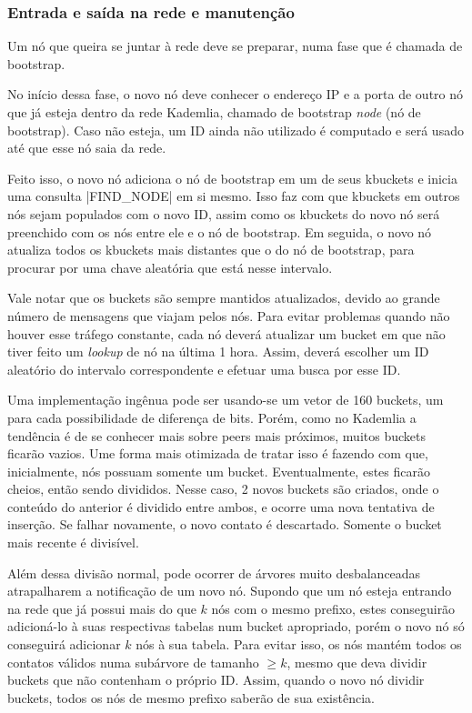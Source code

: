 
\subsubsection*{Entrada e saída na rede e manutenção}

Um nó que queira se juntar à rede deve se preparar, numa fase que é chamada de
\gls{bootstrap}.

No início dessa fase, o novo nó deve conhecer o endereço IP e a porta de outro nó que
já esteja dentro da rede Kademlia, chamado de \gls*{bootstrap} \emph{node} (nó de
\gls*{bootstrap}). Caso não esteja, um ID ainda não utilizado é computado e será usado
até que esse nó saia da rede.

Feito isso, o novo nó adiciona o nó de \gls*{bootstrap} em um de seus \glspl*{kbucket}
e inicia uma consulta \bverb|FIND_NODE| em si mesmo. Isso faz com que \glspl*{kbucket}
em outros nós sejam populados com o novo ID, assim como os \glspl*{kbucket} do novo nó
será preenchido com os nós entre ele e o nó de \gls*{bootstrap}. Em seguida, o novo
nó atualiza todos os \glspl*{kbucket} mais distantes que o do nó de \gls*{bootstrap},
para procurar por uma chave aleatória que está nesse intervalo.

Vale notar que os \glspl*{bucket} são sempre mantidos atualizados, devido ao grande
número de mensagens que viajam pelos nós. Para evitar problemas quando não houver esse
tráfego constante, cada nó deverá atualizar um \gls*{bucket} em que não tiver feito um
\emph{lookup} de nó na última 1 hora. Assim, deverá escolher um ID aleatório do
intervalo correspondente e efetuar uma busca por esse ID.

Uma implementação ingênua pode ser usando-se um vetor de 160 \glspl*{bucket}, um para
cada possibilidade de diferença de bits. Porém, como no Kademlia a tendência é de se
conhecer mais sobre \glspl*{peer} mais próximos, muitos \glspl*{bucket} ficarão vazios.
Ume forma mais otimizada de tratar isso é fazendo com que, inicialmente, nós possuam
somente um \gls*{bucket}. Eventualmente, estes ficarão cheios, então sendo divididos.
Nesse caso, 2 novos \glspl*{bucket} são criados, onde o conteúdo do anterior é dividido
entre ambos, e ocorre uma nova tentativa de inserção. Se falhar novamente, o novo
contato é descartado. Somente o \gls*{bucket} mais recente é divisível.

\newpage
Além dessa divisão normal, pode ocorrer de árvores muito desbalanceadas atrapalharem a
notificação de um novo nó. Supondo que um nó esteja entrando na rede que já possui mais
do que $k$ nós com o mesmo prefixo, estes conseguirão adicioná-lo à suas respectivas
tabelas num \gls*{bucket} apropriado, porém o novo nó só conseguirá adicionar $k$ nós à
sua tabela. Para evitar isso, os nós mantém todos os contatos válidos numa subárvore de
tamanho $\geq k$, mesmo que deva dividir \glspl*{bucket} que não contenham o próprio
ID. Assim, quando o novo nó dividir \glspl*{bucket}, todos os nós de mesmo prefixo
saberão de sua existência.

